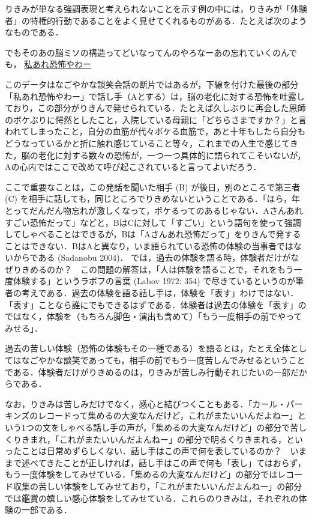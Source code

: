 \documentclass[japanese]{jnlp_1.3b}
\begin{document}
りきみが単なる強調表現と考えられないことを示す例の中には，りきみが「体験者」の特権的行動であることをよく見せてくれるものがある．たとえば次のようなものである．

\vspace{\baselineskip}
でもそのあの脳ミソの構造ってどいなってんのやろなーあの忘れていくのんでも，
    \underline{私あれ恐}\linebreak\underline{怖やわー}
\vspace{\baselineskip}

このデータはなごやかな談笑会話の断片ではあるが，下線を付けた最後の部分「私あれ恐怖やわー」で話し手（Aとする）は，脳の老化に対する恐怖を吐露しており，この部分がりきんで発せられている．たとえば久しぶりに再会した恩師のボケぶりに愕然としたこと，入院している母親に「どちらさまですか？」と言われてしまったこと，自分の血筋が代々ボケる血筋で，あと十年もしたら自分もどうなっているかと折に触れ感じていること等々，これまでの人生で感じてきた，脳の老化に対する数々の恐怖が，一つ一つ具体的に語られてこそいないが，Aの心内ではここで改めて呼び起こされていると言ってよいだろう．

ここで重要なことは，この発話を聞いた相手 (B) が後日，別のところで第三者 (C) を相手に話しても，同じところでりきめないということである．「ほら，年とってだんだん物忘れが激しくなって，ボケるってのあるじゃない．Aさんあれすごい恐怖だって」などと，BはCに対して「すごい」という語句を使って強調してしゃべることはできるが，Bは「Aさんあれ恐怖だって」をりきんで発することはできない．BはAと異なり，いま語られている恐怖の体験の当事者ではないからである (Sadanobu 2004)．
では，過去の体験を語る時，体験者だけがなぜりきめるのか？　この問題の解答は，「人は体験を語ることで，それをもう一度体験する」というラボフの言葉 (Labov 1972: 354) で尽きているというのが筆者の考えである．過去の体験を語る話し手は，体験を「表す」わけではない．「表す」ことなら誰にでもできるはずである．体験者は過去の体験を「表す」のではなく，体験を（もちろん脚色・演出も含めて）「もう一度相手の前でやってみせる」．

過去の苦しい体験（恐怖の体験もその一種である）を語るとは，たとえ全体としてはなごやかな談笑であっても，相手の前でもう一度苦しんでみせるということである．体験者だけがりきめるのは，りきみが苦しみ行動それじたいの一部だからである．

なお，りきみは苦しみだけでなく，感心と結びつくこともある．「カール・パーキンズのレコードって集めるの大変なんだけど，これがまたいいんだよねー」という1つの文をしゃべる話し手の声が，「集めるの大変なんだけど」の部分で苦しくりきまれ，「これがまたいいんだよんねー」の部分で明るくりきまれる，といったことは日常めずらしくない．話し手はこの声で何を表しているのか？　いままで述べてきたことが正しければ，話し手はこの声で何も「表し」てはおらず，もう一度体験をしてみせている．「集めるの大変なんだけど」の部分ではレコード収集の苦しい体験をしてみせており，「これがまたいいんだよんねー」の部分では鑑賞の嬉しい感心体験をしてみせている．これらのりきみは，それぞれの体験の一部である．
\end{document}

